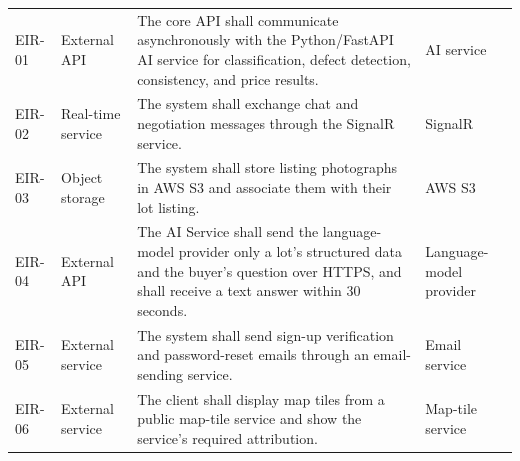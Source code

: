{\begin{longtable}{@{}p{}p{}p{}p{}@{}}
EIR-01 & External API & The core API shall communicate asynchronously with the Python/FastAPI AI service for classification, defect detection, consistency, and price results. & AI service \\
EIR-02 & Real-time service & The system shall exchange chat and negotiation messages through the SignalR service. & SignalR \\
EIR-03 & Object storage & The system shall store listing photographs in AWS S3 and associate them with their lot listing. & AWS S3 \\
EIR-04 & External API & The AI Service shall send the language-model provider only a lot's structured data and the buyer's question over HTTPS, and shall receive a text answer within 30 seconds. & Language-model provider \\
EIR-05 & External service & The system shall send sign-up verification and password-reset emails through an email-sending service. & Email service \\
EIR-06 & External service & The client shall display map tiles from a public map-tile service and show the service's required attribution. & Map-tile service \\
\bottomrule
\end{longtable}
}

